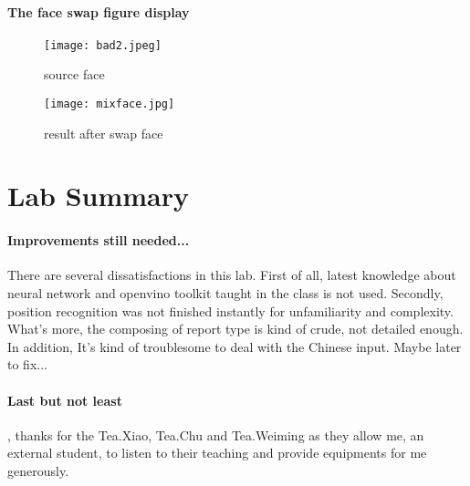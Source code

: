 \documentclass{article}
\begin{document}
	\paragraph{The face swap figure display}
	
	\begin{figure}[h]
	\begin{minipage}{0.49\linewidth}
	\centering
	\texttt{[image: bad2.jpeg]}
	\caption{source face}
	\label{Fig1}
	\end{minipage}
	\begin{minipage}{0.49\linewidth}
	\centering
	\texttt{[image: mixface.jpg]}
	\caption{result after swap face}
	\label{Fig2}
	\end{minipage}
	\end{figure}
	
	\section{Lab Summary}
	\paragraph{Improvements still needed...}There are several dissatisfactions in this lab. First of all, latest knowledge about neural network and  openvino toolkit taught in the class is not used. Secondly, position recognition was not finished instantly for unfamiliarity and complexity. What's more, the composing of report type is kind of crude, not detailed enough. In addition, It's kind of troublesome to deal with the Chinese input. Maybe later to fix...
	\paragraph {Last but not least}, thanks for the Tea.Xiao, Tea.Chu and Tea.Weiming as they allow me, an external student, to listen to their teaching and provide equipments for me generously. 
   	\begin{lstlisting}[language=Python]
	\end{lstlisting}
   
\end{document}
